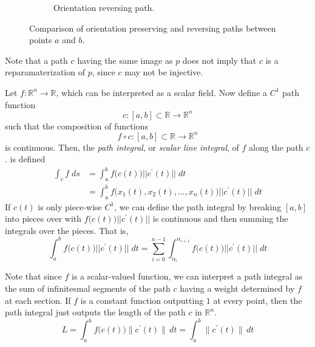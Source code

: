 \begin{definition}
\begin{figure}[H]
\begin{subfigure}[b]{0.47\textwidth}
				\caption{Orientation reversing path.}
				\label{fig:path_reversing}
			\end{subfigure}
			\caption{Comparison of orientation preserving and reversing paths between points $a$ and $b$.}
			\label{fig:orientation_paths}
		\end{figure}
  \end{definition}

	Note that a path $c$ having the same image as $p$ does not imply that $c$ is a reparamaterization of $p$, since $c$ may not be injective. 

  \begin{definition}
		Let $f: \mathbb{R}^n \longrightarrow \mathbb{R}$, which can be interpreted as a scalar field. Now define a $C^1$ path function 
		\begin{equation}
			c: [a,b] \subset \mathbb{R} \longrightarrow \mathbb{R}^n
		\end{equation}
		such that the composition of functions
		\begin{equation}
			f \circ c: [a, b] \subset \mathbb{R} \longrightarrow \mathbb{R}^n
		\end{equation}
		is continuous. Then, the \textit{path integral}, or \textit{scalar line integral}, of $f$ along the path $c$. is defined
		\begin{align}
			\int_c f \;d s & = \int_a^b f\big(c(t)\big) ||c^\prime (t)|| \;d t \\
				& = \int_a^b f\big( x_1 (t), x_2 (t), ..., x_n (t)\big) ||c^\prime (t)|| \; d t
		\end{align}
		If $c(t)$ is only piece-wise $C^1$, we can define the path integral by breaking $[a,b]$ into pieces over with $f\big( c(t)\big) ||c^\prime (t)||$ is continuous and then summing the integrals over the pieces. 
		That is, 
		\begin{equation}
			\int_a^b f\big(c(t)\big) ||c^\prime (t)|| \;d t = \sum_{i = 0}^{n-1} \int_{\alpha_i}^{\alpha_{i+1}} f\big(c(t)\big) ||c^\prime (t)|| \; d t
		\end{equation}
  \end{definition}

  Note that since $f$ is a scalar-valued function, we can interpret a path integral as the sum of infinitesmal segments of the path $c$ having a weight determined by $f$ at each section. 
  If $f$ is a constant function outputting $1$ at every point, then the path integral just outputs the length of the path $c$ in $\mathbb{R}^n$. 
	\begin{equation}
  	L = \int_a^b f\big( c(t)\big) \|c^\prime (t)\| \, dt = \int_a^b \|c^\prime (t)\| \, d t
	\end{equation}

